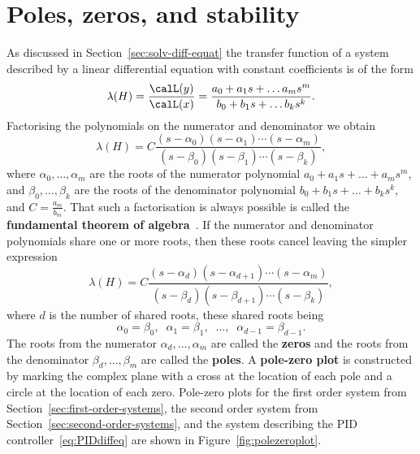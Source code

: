 \documentclass[11pt,a4paper]{book}
\theoremstyle{plain}
\numberwithin{equation}{section}
\newcommand{\term}{\textbf}
\begin{document}
\section{Poles, zeros, and stability}\label{sec:poles-zeros-stab}

As discussed in Section~\ref{sec:solv-diff-equat} the transfer function of a system described by a linear differential equation with constant coefficients is of the form
\[
\lambda(H) = \frac{\calL(y)}{\calL(x)} = \frac{a_0 + a_1s + \dots a_m s^m}{b_0 + b_1s + \dots b_k s^k}.
\]
Factorising the polynomials on the numerator and denominator we obtain
\[
\lambda(H) = C\frac{(s-\alpha_0)(s - \alpha_1)\cdots(s - \alpha_m)}{(s-\beta_0)(s - \beta_1)\cdots(s - \beta_k)},
\] 
where $\alpha_0, \dots, \alpha_m$ are the roots of the numerator polynomial $a_0 + a_1s + \dots + a_m s^m$, and $\beta_0, \dots, \beta_k$ are the roots of the denominator polynomial $b_0 + b_1s + \dots + b_k s^k$, and $C = \tfrac{a_m}{b_m}$.  That such a factorisation is always possible is called the \term{fundamental theorem of algebra}~\citep{Fine_fundamental_theorem_of_algebra}.  %
If the numerator and denominator polynomials share one or more roots, then these roots cancel leaving the simpler expression
\begin{equation}\label{eq:transfuncpoleszeros}
\lambda(H) = C\frac{(s-\alpha_d)(s - \alpha_{d+1})\cdots(s - \alpha_{m})}{(s-\beta_d)(s - \beta_{d+1})\cdots(s - \beta_{k})},
\end{equation}
where $d$ is the number of shared roots, these shared roots being 
\[
\alpha_0 = \beta_0, \;\; \alpha_1 = \beta_1, \;\; \dots, \;\;  \alpha_{d-1} = \beta_{d-1}.
\]
The roots from the numerator $\alpha_d, \dots, \alpha_m$ are called the \term{zeros} and the roots from the denominator $\beta_d, \dots, \beta_m$ are called the \term{poles}.  A \term{pole-zero plot} is constructed by marking the complex plane with a cross at the location of each pole and a circle at the location of each zero.  Pole-zero plots for the first order system from Section~\ref{sec:first-order-systems}, the second order system from Section~\ref{sec:second-order-systems}, and the system describing the PID controller~\eqref{eq:PIDdiffeq} are shown in Figure~\ref{fig:polezeroplot}.
\end{document}
